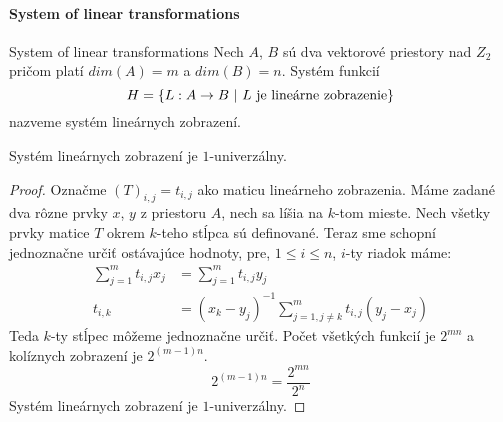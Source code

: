 \paragraph{System of linear transformations}
\begin{definition}{System of linear transformations}
Nech $A$, $B$ sú dva vektorové priestory nad $Z_2$ pričom platí $dim(A) = m$ a $dim(B) = n$. Systém funkcií 
\begin{displaymath}
H = \{L : A \rightarrow B \ | \  L \text{ je lineárne zobrazenie}\}
\end{displaymath}
nazveme systém lineárnych zobrazení.
\end{definition}
\begin{remark}
Systém lineárnych zobrazení je $1$-univerzálny.
\end{remark}
\begin{proof}
Označme $(T)_{i, j}=t_{i, j}$ ako maticu lineárneho zobrazenia. Máme zadané dva rôzne prvky $x$, $y$ z priestoru $A$, nech sa líšia na $k$-tom mieste. Nech všetky prvky matice $T$ okrem $k$-teho stĺpca sú definované. Teraz sme schopní jednoznačne určiť ostávajúce hodnoty, pre, $1 \leq i \leq n$, $i$-ty riadok máme:
\begin{displaymath}
\begin{split}
\displaystyle\sum_{j = 1}^{m}t_{i, j}x_j & = \displaystyle\sum_{j = 1}^{m}t_{i, j}y_j \\
t_{i, k} & = (x_k - y_j)^{-1}\displaystyle\sum_{j = 1, j \neq k}^{m}t_{i, j}(y_j - x_j)
\end{split}
\end{displaymath}
Teda $k$-ty stĺpec môžeme jednoznačne určiť. Počet všetkých funkcií je $2^{mn}$ a kolíznych zobrazení je $2^{(m-1)n}$.
\begin{displaymath}
2^{(m-1)n} = \frac{2^{mn}}{2^n}
\end{displaymath}
Systém lineárnych zobrazení je $1$-univerzálny.
\end{proof}

